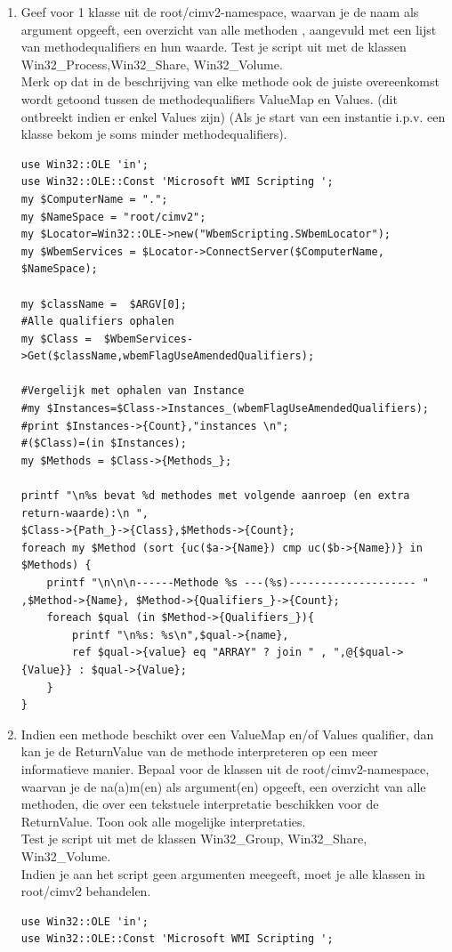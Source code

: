 \documentclass[11pt,a4paper]{report}
\begin{document}
\begin{enumerate}[resume]
	\item Geef voor 1 klasse uit de root/cimv2-namespace, waarvan je de naam als argument opgeeft, een overzicht van alle methoden , aangevuld met een lijst van methodequalifiers en hun waarde.
	Test je script uit met de klassen Win32\_Process,Win32\_Share, Win32\_Volume.
	\\Merk op dat in de beschrijving van elke methode ook de juiste overeenkomst wordt getoond tussen de methodequalifiers ValueMap en Values. (dit ontbreekt indien er enkel Values zijn)
	(Als je start van een instantie i.p.v. een klasse bekom je soms minder methodequalifiers).
	\begin{lstlisting}
use Win32::OLE 'in';
use Win32::OLE::Const 'Microsoft WMI Scripting ';
my $ComputerName = ".";
my $NameSpace = "root/cimv2";
my $Locator=Win32::OLE->new("WbemScripting.SWbemLocator");
my $WbemServices = $Locator->ConnectServer($ComputerName, $NameSpace);

my $className =  $ARGV[0]; 
#Alle qualifiers ophalen 
my $Class =  $WbemServices->Get($className,wbemFlagUseAmendedQualifiers);

#Vergelijk met ophalen van Instance
#my $Instances=$Class->Instances_(wbemFlagUseAmendedQualifiers);
#print $Instances->{Count},"instances \n";
#($Class)=(in $Instances);
my $Methods = $Class->{Methods_};

printf "\n%s bevat %d methodes met volgende aanroep (en extra return-waarde):\n ", 
$Class->{Path_}->{Class},$Methods->{Count};
foreach my $Method (sort {uc($a->{Name}) cmp uc($b->{Name})} in $Methods) {
	printf "\n\n\n------Methode %s ---(%s)-------------------- " ,$Method->{Name}, $Method->{Qualifiers_}->{Count};
	foreach $qual (in $Method->{Qualifiers_}){    
		printf "\n%s: %s\n",$qual->{name},
		ref $qual->{value} eq "ARRAY" ? join " , ",@{$qual->{Value}} : $qual->{Value};
	}    
}
	\end{lstlisting}
	\item Indien een methode beschikt over een ValueMap en/of Values qualifier, dan kan je de ReturnValue van de methode interpreteren op een meer informatieve manier. Bepaal voor de klassen uit de root/cimv2-namespace, waarvan je de na(a)m(en) als argument(en) opgeeft, een overzicht van alle methoden, die over een tekstuele interpretatie beschikken voor de ReturnValue. Toon ook alle mogelijke interpretaties.
	\\Test je script uit met de klassen Win32\_Group, Win32\_Share, Win32\_Volume.
	\\Indien je aan het script geen argumenten meegeeft, moet je alle klassen in root/cimv2 behandelen.
	\begin{lstlisting}
use Win32::OLE 'in';
use Win32::OLE::Const 'Microsoft WMI Scripting ';


\end{lstlisting}
\end{enumerate}
\end{document}
